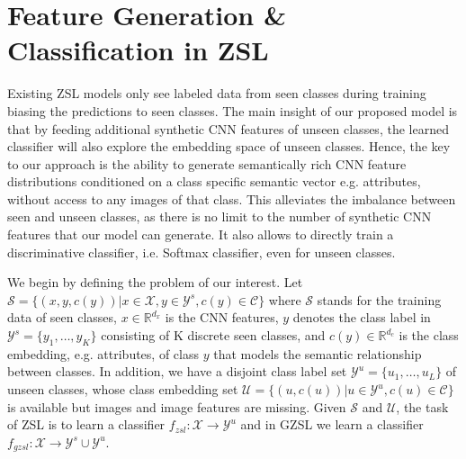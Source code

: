 \documentclass[10pt,twocolumn,letterpaper]{article}
\begin{document}
\section{Feature Generation \& Classification in ZSL}
\label{sec:model}


Existing ZSL models only see labeled data from seen classes during training biasing the predictions to seen classes. The main insight of our proposed model is that by feeding additional synthetic CNN features of unseen classes, the learned classifier will also explore the embedding space of unseen classes. Hence, the key to our approach is the ability to generate semantically rich CNN feature distributions conditioned on a class specific semantic vector e.g. attributes, without access to any images of that class. This alleviates the imbalance between seen and unseen classes, as there is no limit to the number of synthetic CNN features that our model can generate. It also allows to directly train a discriminative classifier, i.e. Softmax classifier, even for unseen classes. 

We begin by defining the problem of our interest. Let  $\mathcal{S} = \{ (x, y, c(y)) | x \in \mathcal{X}, y \in \mathcal{Y}^{s}, c(y) \in \mathcal{C} \}$ where $\mathcal{S}$ stands for the training data of seen classes, $x\in \mathbb{R}^{d_x}$ is the CNN features, $y$ denotes the class label in $\mathcal{Y}^{s}=\{y_1,\ldots, y_K\}$ consisting of K discrete seen classes, and $c(y)\in \mathbb{R}^{d_c}$ is the class embedding, e.g. attributes, of class $y$ that models the semantic relationship between classes. 
In addition, we have a disjoint class label set $\mathcal{Y}^{u}=\{u_1,\ldots, u_L\}$ of unseen classes, whose class embedding set $\mathcal{U}=\{(u, c(u)) | u \in \mathcal{Y}^{u}, c(u)\in \mathcal{C}\}$ is available but images and image features are missing. Given $\mathcal{S}$ and $\mathcal{U}$, the task of ZSL is to learn a classifier $f_{zsl}:\mathcal{X}\rightarrow \mathcal{Y}^{u}$ and in GZSL we learn a classifier $f_{gzsl}:\mathcal{X}\rightarrow \mathcal{Y}^{s} \cup \mathcal{Y}^{u}$.
\end{document}
